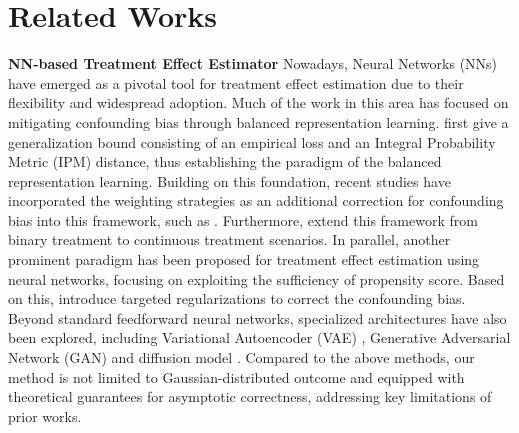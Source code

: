 \section{Related Works}
\textbf{NN-based Treatment Effect Estimator}
Nowadays, 
Neural Networks (NNs) have emerged as a pivotal tool for treatment effect estimation due to their flexibility and widespread adoption.
Much of the work in this area has focused on mitigating confounding bias through balanced representation learning.
\cite{johansson2016learning,shalit2017estimating} first give a generalization bound consisting of an empirical loss and an Integral Probability Metric (IPM) distance,
thus establishing the paradigm of the balanced representation learning.
Building on this foundation, 
recent studies have incorporated the weighting strategies as an additional correction for confounding bias into this framework, 
such as \cite{johansson2018learning, hassanpour2019counterfactual, assaad2021counterfactual}.
Furthermore,
\cite{wang2022generalization, kazemi2024adversarially} extend this framework from binary treatment to continuous treatment scenarios.
In parallel, 
another prominent paradigm has been proposed for treatment effect estimation using neural networks, focusing on exploiting the sufficiency of propensity score.
Based on this,
\cite{shi2019adapting, nie2021vcnet} introduce targeted regularizations to correct the confounding bias.
Beyond standard feedforward neural networks, specialized architectures have also been explored,
including Variational Autoencoder (VAE) \cite{louizos2017causal}, 
Generative Adversarial Network (GAN) \cite{yoon2018ganite, bica2020estimating} and diffusion model \cite{sanchez2022diffusion}.
Compared to the above methods, 
our method is not limited to Gaussian-distributed outcome and equipped with theoretical guarantees for asymptotic correctness, 
addressing key limitations of prior works.

